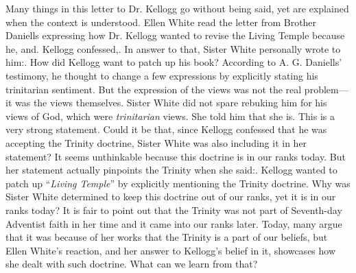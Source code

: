 Many things in this letter to Dr. Kellogg go without being said, yet are explained when the context is understood. Ellen White read the letter from Brother Daniells expressing how Dr. Kellogg wanted to revise the Living Temple because he, and. Kellogg confessed,. In answer to that, Sister White personally wrote to him:. How did Kellogg want to patch up his book? According to A. G. Daniells’ testimony, he thought to change a few expressions by explicitly stating his trinitarian sentiment. But the expression of the views was not the real problem—it was the views themselves. Sister White did not spare rebuking him for his views of God, which were \textit{trinitarian} views. She told him that she is. This is a very strong statement. Could it be that, since Kellogg confessed that he was accepting the Trinity doctrine, Sister White was also including it in her statement? It seems unthinkable because this doctrine is in our ranks today. But her statement actually pinpoints the Trinity when she said:. Kellogg wanted to patch up “\textit{Living Temple}” by explicitly mentioning the Trinity doctrine. Why was Sister White determined to keep this doctrine out of our ranks, yet it is in our ranks today? It is fair to point out that the Trinity was not part of Seventh-day Adventist faith in her time and it came into our ranks later. Today, many argue that it was because of her works that the Trinity is a part of our beliefs, but Ellen White’s reaction, and her answer to Kellogg’s belief in it, showcases how she dealt with such doctrine. What can we learn from that?


